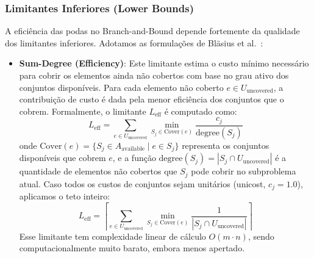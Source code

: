 \documentclass[conference]{IEEEtran}
\begin{document}
\subsubsection{Limitantes Inferiores (Lower Bounds)}
A eficiência das podas no Branch-and-Bound depende fortemente da qualidade dos limitantes inferiores. Adotamos as formulações de Bläsius et al.~\cite{b2}:
\begin{itemize}
\item \textbf{Sum-Degree (Efficiency)}: Este limitante estima o custo mínimo necessário para cobrir os elementos ainda não cobertos com base no grau ativo dos conjuntos disponíveis. Para cada elemento não coberto $e \in U_{\text{uncovered}}$, a contribuição de custo é dada pela menor eficiência dos conjuntos que o cobrem. Formalmente, o limitante $L_{\text{eff}}$ é computado como:
\begin{equation}
L_{\text{eff}} = \sum_{e \in U_{\text{uncovered}}} \min_{S_j \in \text{Cover}(e)} \frac{c_j}{\text{degree}(S_j)}
\end{equation}
onde $\text{Cover}(e) = \{ S_j \in A_{\text{available}} \mid e \in S_j \}$ representa os conjuntos disponíveis que cobrem $e$, e a função $\text{degree}(S_j) = |S_j \cap U_{\text{uncovered}}|$ é a quantidade de elementos não cobertos que $S_j$ pode cobrir no subproblema atual. Caso todos os custos de conjuntos sejam unitários (unicost, $c_j = 1.0$), aplicamos o teto inteiro:
\begin{equation}
L_{\text{eff}} = \left\lceil \sum_{e \in U_{\text{uncovered}}} \min_{S_j \in \text{Cover}(e)} \frac{1}{|S_j \cap U_{\text{uncovered}}|} \right\rceil
\end{equation}
Esse limitante tem complexidade linear de cálculo $O(m \cdot n)$, sendo computacionalmente muito barato, embora menos apertado.


\end{itemize}
\end{document}
